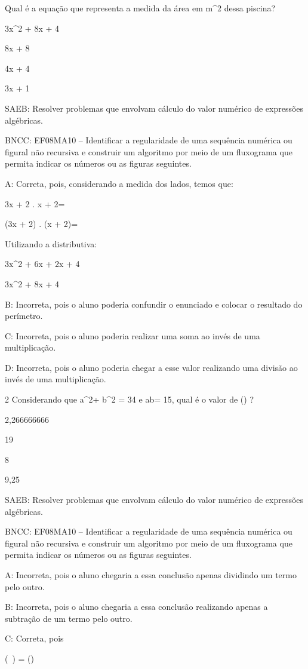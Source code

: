 {Qual é a equação que representa a medida da área em m^2 dessa piscina?
\item 3x^2 + 8x + 4
\item 8x + 8
\item 4x + 4
\item 3x + 1

SAEB: Resolver problemas que envolvam cálculo do valor numérico de
expressões algébricas.

BNCC: EF08MA10 -- Identificar a regularidade de uma sequência numérica
ou figural não recursiva e construir um algoritmo por meio de um
fluxograma que permita indicar os números ou as figuras seguintes.

A: Correta, pois, considerando a medida dos lados, temos que:

3x + 2 . x + 2=

(3x + 2) . (x + 2)=

Utilizando a distributiva:

3x^2 + 6x + 2x + 4

3x^2 + 8x + 4

B: Incorreta, pois o aluno poderia confundir o enunciado e colocar o
resultado do perímetro.

C: Incorreta, pois o aluno poderia realizar uma soma ao invés de uma
multiplicação.

D: Incorreta, pois o aluno poderia chegar a esse valor realizando uma
divisão ao invés de uma multiplicação.

\num{2} Considerando que a^2+ b^2 = 34 e ab= 15, qual é o valor de
() ?
\item 2,266666666
\item 19
\item 8
\item 9,25

SAEB: Resolver problemas que envolvam cálculo do valor numérico de
expressões algébricas.

BNCC: EF08MA10 -- Identificar a regularidade de uma sequência numérica
ou figural não recursiva e construir um algoritmo por meio de um
fluxograma que permita indicar os números ou as figuras seguintes.

A: Incorreta, pois o aluno chegaria a essa conclusão apenas dividindo um
termo pelo outro.

B: Incorreta, pois o aluno chegaria a essa conclusão realizando apenas a
subtração de um termo pelo outro.

C: Correta, pois

(\ ) = ()

}
